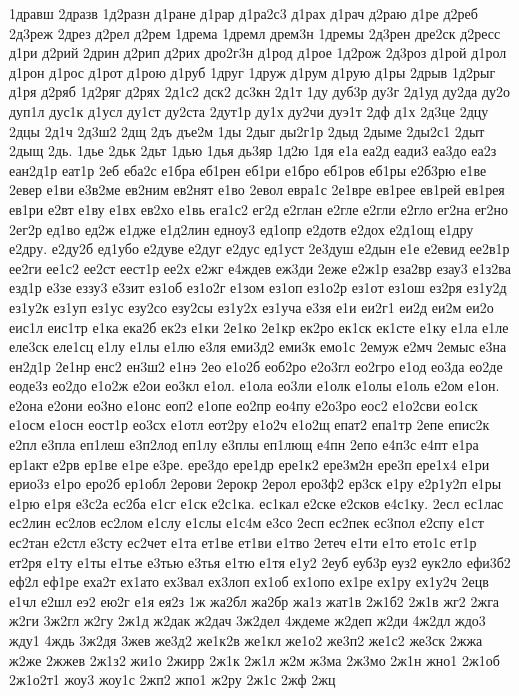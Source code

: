 {1дравш
2дразв
1д2разн
д1ране
д1рар
д1ра2с3
д1рах
д1рач
д2раю
д1ре
д2реб
2д3реж
2дрез
д2рел
д2рем
1дрема
1дремл
дрем3н
1дремы
2д3рен
дре2ск
д2ресс
д1ри
д2рий
2дрин
д2рип
д2рих
дро2г3н
д1род
д1рое
1д2рож
2д3роз
д1рой
д1рол
д1рон
д1рос
д1рот
д1рою
д1руб
1друг
1друж
д1рум
д1рую
д1ры
2дрыв
1д2рыг
д1ря
д2ряб
1д2ряг
д2рях
2д1с2
дск2
дс3кн
2д1т
1ду
дуб3р
ду3г
2д1уд
ду2да
ду2о
дуп1л
дус1к
д1усл
ду1ст
ду2ста
2дут1р
ду1х
ду2чи
дуэ1т
2дф
д1х
2д3це
2дцу
2дцы
2д1ч
2д3ш2
2дщ
2дъ
дъе2м
1ды
2дыг
ды2г1р
2дыд
2дыме
2ды2с1
2дыт
2дыщ
2дь.
1дье
2дьк
2дьт
1дью
1дья
дь3яр
1д2ю
1дя
е1а
еа2д
еади3
еа3до
еа2з
еан2д1р
еат1р
2еб
еба2с
е1бра
еб1рен
еб1ри
е1бро
еб1ров
еб1ры
е2б3рю
е1ве
2евер
е1ви
е3в2ме
ев2ним
ев2нят
е1во
2евол
евра1с
2е1вре
ев1рее
ев1рей
ев1рея
ев1ри
е2вт
е1ву
е1вх
ев2хо
е1вь
ега1с2
ег2д
е2глан
е2гле
е2гли
е2гло
ег2на
ег2но
2ег2р
ед1во
ед2ж
е1дже
е1д2лин
едноу3
ед1опр
е2дотв
е2дох
е2д1ощ
е1дру
е2дру.
е2ду2б
ед1убо
е2дуве
е2дуг
е2дус
ед1уст
2е3душ
е2дын
е1е
е2евид
ее2в1р
ее2ги
ее1с2
ее2ст
еест1р
ее2х
е2жг
е4ждев
еж3ди
2еже
е2ж1р
еза2вр
езау3
е1з2ва
езд1р
е3зе
еззу3
е3зит
ез1об
ез1о2г
е1зом
ез1оп
ез1о2р
ез1от
ез1ош
ез2ря
ез1у2д
ез1у2к
ез1уп
ез1ус
езу2со
езу2сы
ез1у2х
ез1уча
е3зя
е1и
еи2г1
еи2д
еи2м
еи2о
еис1л
еис1тр
е1ка
ека2б
ек2з
е1ки
2е1ко
2е1кр
ек2ро
ек1ск
ек1сте
е1ку
е1ла
е1ле
еле3ск
еле1сц
е1лу
е1лы
е1лю
е3ля
еми3д2
еми3к
емо1с
2емуж
е2мч
2емыс
е3на
ен2д1р
2е1нр
енс2
ен3ш2
е1нэ
2ео
е1о2б
еоб2ро
е2о3гл
ео2гро
е1од
ео3да
ео2де
еоде3з
ео2до
е1о2ж
е2ои
ео3кл
е1ол.
е1ола
ео3ли
е1олк
е1олы
е1оль
е2ом
е1он.
е2она
е2они
ео3но
е1онс
еоп2
е1опе
ео2пр
ео4пу
е2о3ро
еос2
е1о2сви
ео1ск
е1осм
е1осн
еост1р
ео3сх
е1отл
еот2ру
е1о2ч
е1о2щ
епат2
епа1тр
2епе
епис2к
е2пл
е3пла
еп1леш
е3п2лод
еп1лу
е3плы
еп1лющ
е4пн
2епо
е4п3с
е4пт
е1ра
ер1акт
е2рв
ер1ве
е1ре
е3ре.
ере3до
ере1др
ере1к2
ере3м2н
ере3п
ере1х4
е1ри
ерио3з
е1ро
еро2б
ер1обл
2ерови
2ерокр
2ерол
еро3ф2
ер3ск
е1ру
е2р1у2п
е1ры
е1рю
е1ря
е3с2а
ес2ба
е1сг
е1ск
е2с1ка.
ес1кал
е2ске
е2сков
е4с1ку.
2есл
ес1лас
ес2лин
ес2лов
ес2лом
е1слу
е1слы
е1с4м
е3со
2есп
ес2пек
ес3пол
е2спу
е1ст
ес2тан
е2стл
е3сту
ес2чет
е1та
ет1ве
ет1ви
е1тво
2етеч
е1ти
е1то
ето1с
ет1р
ет2ря
е1ту
е1ты
е1тье
е3тью
е3тья
е1тю
е1тя
е1у2
2еуб
еуб3р
еуз2
еук2ло
ефи3б2
еф2л
еф1ре
еха2т
ех1ато
ех3вал
ех3лоп
ех1об
ех1опо
ех1ре
ех1ру
ех1у2ч
2ецв
е1чл
е2шл
еэ2
ею2г
е1я
ея2з
1ж
жа2бл
жа2бр
жа1з
жат1в
2ж1б2
2ж1в
жг2
2жга
ж2ги
3ж2гл
ж2гу
2ж1д
ж2дак
ж2дач
3ж2дел
4ждеме
ж2деп
ж2ди
4ж2дл
ждо3
жду1
4ждь
3ж2дя
3жев
же3д2
же1к2в
же1кл
же1о2
же3п2
же1с2
же3ск
2жжа
ж2же
2жжев
2ж1з2
жи1о
2жирр
2ж1к
2ж1л
ж2м
ж3ма
2ж3мо
2ж1н
жно1
2ж1об
2ж1о2т1
жоу3
жоу1с
2жп2
жпо1
ж2ру
2ж1с
2жф
2жц
}
